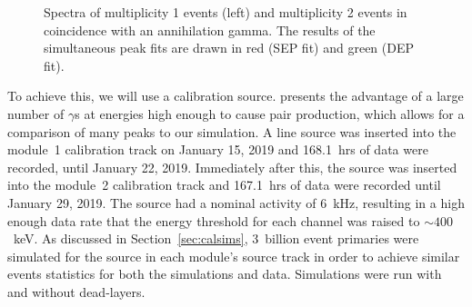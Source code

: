 \documentclass[/main.tex]{subfiles}
\begin{document}
\begin{figure}[t]
  \centering
  \caption[Spectra of multiplicty 1 and 2  data with peak fits]{\label{fig:Co56Spectra}
    Spectra of multiplicity 1  events (left) and multiplicity 2  events in coincidence with an annihilation gamma. The results of the simultaneous peak fits are drawn in red (SEP fit) and green (DEP fit).
  }
\end{figure}
To achieve this, we will use a  calibration source.
 presents the advantage of a large number of $\gamma$s at energies high enough to cause pair production, which allows for a comparison of many peaks to our simulation.
A  line source was inserted into the module~1 calibration track on January 15, 2019 and 168.1~hrs of data were recorded, until January 22, 2019.
Immediately after this, the source was inserted into the module~2 calibration track and 167.1~hrs of data were recorded until January 29, 2019.
The source had a nominal activity of 6~kHz, resulting in a high enough data rate that the energy threshold for each channel was raised to ${\sim}400$~keV.
As discussed in Section~\ref{sec:calsims}, 3~billion event primaries were simulated for the  source in each module's source track in order to achieve similar events statistics for both the simulations and data.
Simulations were run with and without dead-layers.
\end{document}
